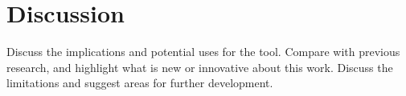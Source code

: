 \section{Discussion}
\label{sec:discussion}
Discuss the implications and potential uses for the tool. Compare with previous research, and highlight what is new or innovative about this work. Discuss the limitations and suggest areas for further development.